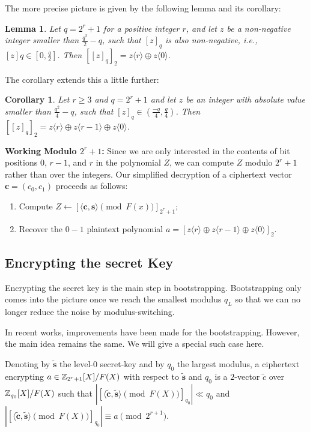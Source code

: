 \documentclass[12pt]{article}
\theoremstyle{plain}
\newtheorem{corollary}{Corollary}
\newtheorem{lemma}{Lemma}
\theoremstyle{definition}
\theoremstyle{remark}
\begin{document}
The more precise picture is given by the following lemma and its corollary:
\begin{lemma}
Let $q = 2^r + 1$ for a positive integer $r$, and let $z$ be a non-negative integer
smaller than $\frac{q^2}{2}-q$, such that $[z]_q$ is also non-negative, i.e., $[z]q \in [0, \frac{q}{2}]$.  Then $[[z]_q]_2=z\langle r \rangle\oplus z\langle 0 \rangle$. \end{lemma}
The corollary extends this a little further:
\begin{corollary}
Let $r\geq 3$ and $q = 2^r+1$ and let $z$ be an integer with absolute value
smaller than $\frac{q^2}{4}-q$, such that $[z]_q \in (\frac{-q}{4}, \frac{q}{4})$. Then $[[z]_q]_2=z\langle r \rangle\oplus z\langle r-1 \rangle \oplus z\langle 0 \rangle$.
\end{corollary}

{ \bf Working Modulo $2^r+1$:} Since we are only interested in the contents of bit positions $0$, $r-1$, and $r$ in the polynomial $Z$, we can compute $Z$ modulo $2^r+1$ rather than over the integers. Our simplified decryption of a ciphertext vector $\mathbf{c} = (c_0, c_1)$ proceeds as
follows:
\begin{enumerate}
    \item Compute $Z \leftarrow [\langle\mathbf{c}, \mathbf{s}\rangle \pmod{F(x)}]_{2^r+1}$;
    \item Recover the $0-1$ plaintext polynomial $a =[z\langle r \rangle\oplus z\langle r-1 \rangle \oplus z\langle 0 \rangle]_2$.
\end{enumerate}

\subsection{Encrypting the secret Key}
 Encrypting the secret key is the main step in bootstrapping. Bootstrapping only comes into the picture once we reach the smallest modulus $q_L$ so that we can no longer reduce the noise by modulus-switching.

 In recent works, improvements have been made for the bootstrapping. However, the main idea remains the same. We will give a special such case here.

Denoting by $\tilde{\mathbf{s}}$ the level-$0$ secret-key and by $q_0$ the largest
modulus, a ciphertext encrypting $a \in \mathbb{Z}_{2^r+1}[X]/F(X)$ with respect to $\tilde{\mathbf{s}}$ and $q_0$ is a $2$-vector $\tilde{c}$ over $\mathbb{Z}_{q_0}[X]/F(X)$ such that $|[\langle \tilde{\mathbf{c}},\tilde{\mathbf{s}}\rangle \pmod{F(X)}]_{q_0}| \ll q_0$ and  $|[\langle \tilde{\mathbf{c}},\tilde{\mathbf{s}}\rangle \pmod{F(X)}]_{q_0}| \equiv a \pmod{2^{r+1}}$.
\end{document}
